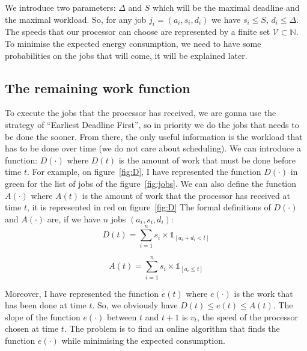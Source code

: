 \documentclass[
10pt, %
a4paper, %
oneside, %
headinclude,footinclude, %
BCOR5mm, %
]{scrartcl}
\newcommand{\N}{\mathbb{N}}
\newcommand{\V}{\mathcal{V}}
\begin{document}
We introduce two parameters: $\Delta$ and $S$ which will be the maximal
deadline and the maximal workload. So, for any job
$j_i=(a_i,s_i,d_i)$ we have $s_i\leq S$, $d_i\leq \Delta$.
The speeds that our processor can choose are represented by a finite
set $\V\subset\N$. To minimise the expected energy consumption, we
need to have some probabilities on the jobs that will
come, it will be explained later.

\subsection{The remaining work function}
To execute the jobs that the processor has
received, we are gonna use the strategy of ``Earliest Deadline
First'', so in priority we do the jobs that needs to be done the
sooner. From there, the only useful information is the workload that
has to be done over time (we do not care about scheduling). 
We can introduce a function: $D(\cdot)$ where $D(t)$ is the amount of
work that must be done before time $t$. For example, on
figure~\ref{fig:D}, I have represented the function $D(\cdot)$ in
green for the list of jobs of the figure~\ref{fig:jobs}. We can also
define the function $A(\cdot)$ where $A(t)$ is the amount of work that
the processor has received at time $t$, it is represented in red on
figure~\ref{fig:D} The formal definitions of $D(\cdot)$ and $A(\cdot)$
are, if we have $n$ jobs $(a_i,s_i,d_i)$:
\begin{equation}
  \label{eq:D}
  D(t) = \sum_{i=1}^ns_i\times\mathbb{1}_{[a_i+d_i<t]}
\end{equation}

\begin{equation}
  \label{eq:A}
  A(t) = \sum_{i=1}^ns_i\times\mathbb{1}_{[a_i\leq t]}
\end{equation}

Moreover, I have represented the function $e(t)$
where $e(\cdot)$ is the work that has been done at time $t$. So, we
obviously have $D(t)\leq e(t)\leq A(t)$. The slope of the function
$e(\cdot)$ between $t$ and $t+1$ is $v_t$, the speed of the
processor chosen at time $t$. The problem is to find an online
algorithm that finds the function $e(\cdot)$ while minimising the
expected consumption.\\
\end{document}
